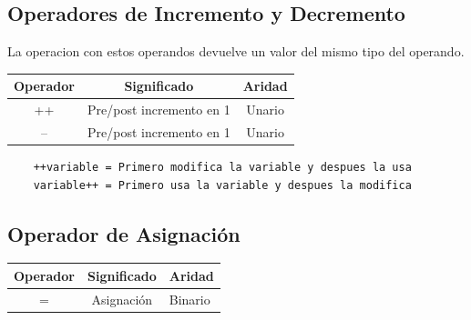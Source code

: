 \documentclass{article}
\begin{document}
\subsection{Operadores de Incremento y Decremento}
La operacion con estos operandos devuelve un valor del mismo tipo del operando.
\begin{table}[H]\centering
    \begin{tabular}{|c|c|c|}
    \hline
    \rowcolor[HTML]{C0C0C0} 
    Operador & Significado              & Aridad \\ \hline
    ++       & Pre/post incremento en 1 & Unario \\ \hline
    --       & Pre/post incremento en 1 & Unario \\ \hline
    \end{tabular}
    \end{table}
\begin{lstlisting}
    ++variable = Primero modifica la variable y despues la usa
    variable++ = Primero usa la variable y despues la modifica
\end{lstlisting}

\subsection{Operador de Asignación}
\begin{table}[H]\centering
    \begin{tabular}{|c|c|l|}
    \hline
    \rowcolor[HTML]{C0C0C0} 
    Operador & Significado & Aridad  \\ \hline
    =        & Asignación  & Binario \\ \hline
    \end{tabular}
    \end{table}
\end{document}
